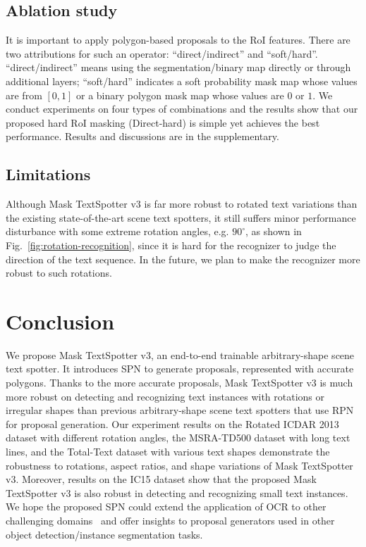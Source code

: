 \documentclass[runningheads]{llncs}
\begin{document}
\subsection{Ablation study} \label{sec:ablation}
It is important to apply polygon-based proposals to the RoI features. There are two attributions for such an operator: ``direct/indirect'' and ``soft/hard''. ``direct/indirect'' means using the segmentation/binary map directly or through additional layers; ``soft/hard'' indicates a soft probability mask map whose values are from $[0, 1]$ or a binary polygon mask map whose values are $0$ or $1$. We conduct experiments on four types of combinations and the results show that our proposed hard RoI masking (Direct-hard) is simple yet achieves the best performance. Results and discussions are in the supplementary.


\subsection{Limitations}
Although Mask TextSpotter v3 is far more robust to rotated text variations than the existing state-of-the-art scene text spotters, it still suffers minor performance disturbance with some extreme rotation angles, e.g. $90^\circ$, as shown in Fig.~\ref{fig:rotation-recognition}, since it is hard for the recognizer to judge the direction of the text sequence. In the future, we plan to make the recognizer more robust to such rotations.

\section{Conclusion}
We propose Mask TextSpotter v3, an end-to-end trainable arbitrary-shape scene text spotter. It introduces SPN to generate proposals, represented with accurate polygons. Thanks to the more accurate proposals, Mask TextSpotter v3 is much more robust on detecting and recognizing text instances with rotations or irregular shapes than previous arbitrary-shape scene text spotters that use RPN for proposal generation. Our experiment results on the Rotated ICDAR 2013 dataset with different rotation angles, the MSRA-TD500 dataset with long text lines, and the Total-Text dataset with various text shapes demonstrate the robustness to rotations, aspect ratios, and shape variations of Mask TextSpotter v3. Moreover, results on the IC15 dataset show that the proposed Mask TextSpotter v3 is also robust in detecting and recognizing small text instances. We hope the proposed SPN could extend the application of OCR to other challenging domains~\cite{hassner2012computation} and offer insights to proposal generators used in other object detection/instance segmentation tasks.
\end{document}
